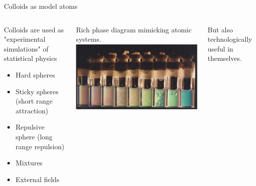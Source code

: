 \documentclass{beamer}
\begin{document}
\begin{frame}{Colloids as model atoms}
	\begin{columns}
	\begin{block}{Colloids are used as "experimental simulations" of statistical physics}
	\begin{itemize}
	\item Hard spheres
	\item Sticky spheres (short range attraction)
	\item Repulsive sphere (long range repulsion)
	\item Mixtures
	\item External fields
	\end{itemize}
	\end{block}
	
	Rich phase diagram mimicking atomic systems.
	\includegraphics[width=\columnwidth]{Pusey_vanMegen}\\
	\footnotesize{\citet{pusey1986}}
	
	But also technologically useful in themselves.
	\end{columns}
\end{frame}
\end{document}

